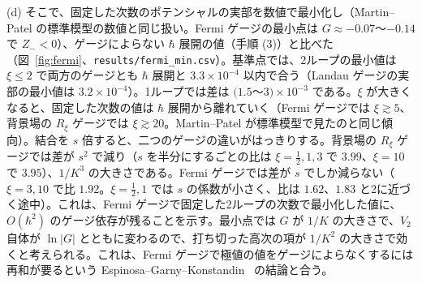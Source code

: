 \documentclass[a4paper,10pt]{ltjsarticle}
\begin{document}
(d) そこで、固定した次数のポテンシャルの実部を数値で最小化し（Martin--Patel の標準模型の数値と同じ扱い。Fermi ゲージの最小点は $G\approx-0.07$〜$-0.14$ で $Z_-<0$）、ゲージによらない $\hbar$ 展開の値（手順 (3)）と比べた（図~\ref{fig:fermi}、\texttt{results/fermi\_min.csv}）。基準点では、2ループの最小値は $\xi\le2$ で両方のゲージとも $\hbar$ 展開と $3.3\times10^{-4}$ 以内で合う（Landau ゲージの実部の最小値は $3.2\times10^{-4}$）。1ループでは差は $(1.5$〜$3)\times10^{-3}$ である。$\xi$ が大きくなると、固定した次数の値は $\hbar$ 展開から離れていく（Fermi ゲージでは $\xi\gtrsim5$、背景場の $R_\xi$ ゲージでは $\xi\gtrsim20$。Martin--Patel が標準模型で見たのと同じ傾向）。結合を $s$ 倍すると、二つのゲージの違いがはっきりする。背景場の $R_\xi$ ゲージでは差が $s^2$ で減り（$s$ を半分にするごとの比は $\xi=\frac12,1,3$ で $3.99$、$\xi=10$ で $3.95$）、$1/K^3$ の大きさである。Fermi ゲージでは差が $s$ でしか減らない（$\xi=3,10$ で比 $1.92$。$\xi=\frac12,1$ では $s$ の係数が小さく、比は $1.62$、$1.83$ と2に近づく途中）。これは、Fermi ゲージで固定した2ループの次数で最小化した値に、$O(\hbar^2)$ のゲージ依存が残ることを示す。最小点では $G$ が $1/K$ の大きさで、$V_2$ 自体が $\ln|G|$ とともに変わるので、打ち切った高次の項が $1/K^2$ の大きさで効くと考えられる。これは、Fermi ゲージで極値の値をゲージによらなくするには再和が要るという Espinosa--Garny--Konstandin~\cite{egk16} の結論と合う。
\end{document}
